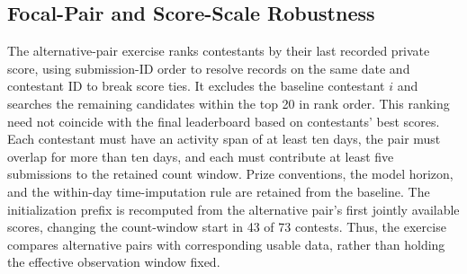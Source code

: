 \documentclass[mnsc]{informs3}
\begin{document}
\begin{APPENDICES}
{\begin{minipage}{\textwidth}
\end{minipage}
}




\subsection{Focal-Pair and Score-Scale Robustness}\label{app-robustness-statistics}





{The alternative-pair exercise ranks contestants by their last recorded private score, using submission-ID order to resolve records on the same date and contestant ID to break score ties. It excludes the baseline contestant $i$ and searches the remaining candidates within the top 20 in rank order. This ranking need not coincide with the final leaderboard based on contestants' best scores. Each contestant must have an activity span of at least ten days, the pair must overlap for more than ten days, and each must contribute at least five submissions to the retained count window. Prize conventions, the model horizon, and the within-day time-imputation rule are retained from the baseline. The initialization prefix is recomputed from the alternative pair's first jointly available scores, changing the count-window start in 43 of 73 contests. Thus, the exercise compares alternative pairs with corresponding usable data, rather than holding the effective observation window fixed.}


\end{APPENDICES}
\end{document}
